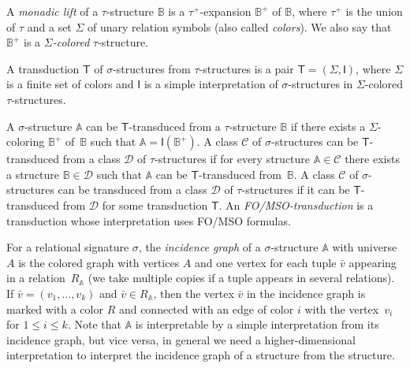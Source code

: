\documentclass[1p,number,a4paper]{elsarticle}
\theoremstyle{remark}
\newcommand{\Cc}{\mathscr{C}}
\newcommand{\Dd}{\mathscr{D}}
\newcommand{\strA}{\mathbb{A}}
\newcommand{\strB}{\mathbb{B}}
\begin{document}
A \emph{monadic lift} of a $\tau$-structure $\strB$ is a $\tau^+$-expansion
$\strB^+$ of $\strB$, where $\tau^+$ is the union of $\tau$ and a
set $\Sigma$ of unary relation symbols (also called \emph{colors}). 
We also say that $\strB^+$ is a \emph{$\Sigma$-colored} $\tau$-structure. 

A transduction $\mathsf{T}$ of $\sigma$-structures from $\tau$-structures 
is a pair $\mathsf T=(\Sigma, \mathsf I)$, where $\Sigma$ is a finite set of colors and $\mathsf I$ is a simple interpretation of $\sigma$-structures in $\Sigma$-colored \mbox{$\tau$-structures}. 


A $\sigma$-structure $\strA$ can
be $\mathsf T$-transduced from a $\tau$-structure $\strB$ if there exists a $\Sigma$-coloring $\strB^+$ of~$\strB$ such that $\strA=\mathsf I(\strB^+)$. 
A class $\Cc$ of $\sigma$-structures can be $\mathsf T$-transduced from a class $\Dd$ of $\tau$-structures if for every structure $\strA\in \Cc$ there exists a structure $\strB\in \Dd$ such that $\strA$ can be $\mathsf T$-transduced from~$\strB$. 
A class $\Cc$ of $\sigma$-structures can be transduced from a class $\Dd$ of $\tau$-structures if it can be
$\mathsf T$-transduced from $\Dd$ for some transduction $\mathsf T$.
An {\em FO/MSO-transduction} is a transduction whose interpretation uses FO/MSO formulas. 


For a relational signature $\sigma$, the \emph{incidence graph} of a $\sigma$-structure $\strA$ with universe $A$ is the colored graph with vertices $A$ and one vertex for each tuple $\bar v$ appearing in a relation~$R_\strA$ (we take multiple copies if a tuple appears in several relations). 
If $\bar v=(v_1,\ldots, v_k)$ and $\bar v\in R_\strA$, then the vertex $\bar v$ in the incidence graph is marked with a color $R$ and connected with an edge of color $i$ with the vertex~$v_i$ for $1\leq i\leq k$. 
Note that $\strA$ is interpretable by a simple interpretation from its incidence graph, but vice versa, in general we need a higher-dimensional interpretation to interpret the incidence graph of a structure from the structure. 
\end{document}
